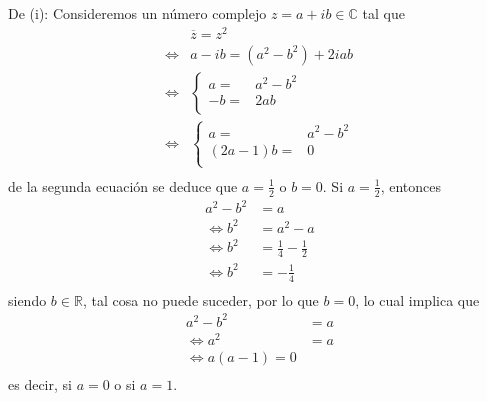 \documentclass[12pt]{report}
\theoremstyle{largebreak}
\newcommand{\conj}[1]{\ensuremath{\overline{#1}}}
\begin{document}
    \begin{sol}
        De (i): Consideremos un número complejo $z=a+ib\in\mathbb{C}$ tal que
        \begin{equation*}
            \begin{split}
                &\conj{z}=z^2\\
                \iff& a-ib=(a^2-b^2)+2iab\\
                \iff& \left\{
                    \begin{array}{rl}
                        a=& a^2-b^2\\
                        -b=&2ab\\
                    \end{array}
                \right.\\
                \iff& \left\{
                    \begin{array}{rl}
                        a=& a^2-b^2\\
                        (2a-1)b=&0\\
                    \end{array}
                \right.\\
            \end{split}
        \end{equation*}
        de la segunda ecuación se deduce que $a=\frac{1}{2}$ o $b=0$. Si $a=\frac{1}{2}$, entonces
        \begin{equation*}
            \begin{split}
                a^2-b^2&=a\\
                \iff b^2&=a^2-a\\
                \iff b^2&=\frac{1}{4}-\frac{1}{2}\\
                \iff b^2&=-\frac{1}{4}\\
            \end{split}
        \end{equation*}
        siendo $b\in\mathbb{R}$, tal cosa no puede suceder, por lo que $b=0$, lo cual implica que
        \begin{equation*}
            \begin{split}
                a^2-b^2&=a\\
                \iff a^2&=a\\
                \iff a(a-1)=0\\
            \end{split}
        \end{equation*}
        es decir, si $a=0$ o si $a=1$.


\end{sol}
\end{document}
